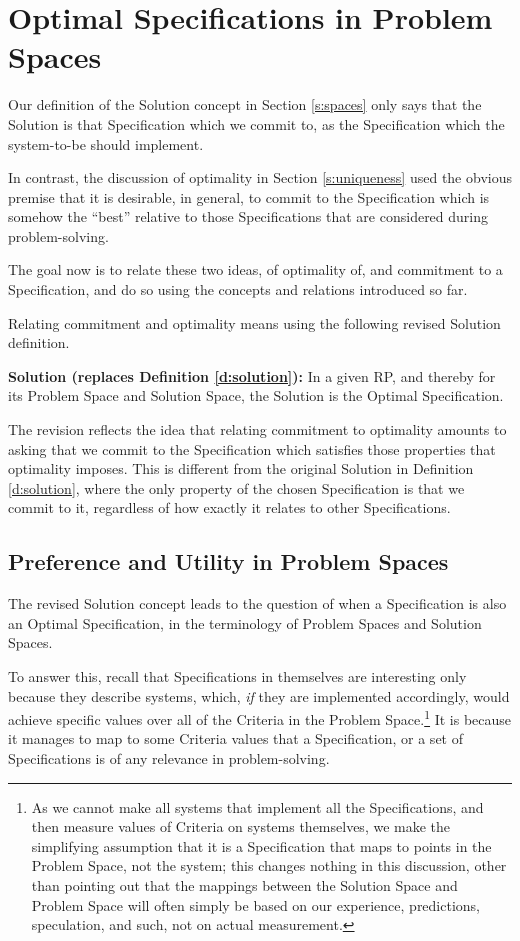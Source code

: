 \documentclass[graybox]{svmult}
\newcommand{\zi}[1]{\textit{#1}}
\newcommand{\xb}[1]{\textbf{#1}}
\newcommand{\RP}{RP}
\newcommand{\SolutionSpace}{Solution Space}
\newcommand{\ProblemSpace}{Problem Space}
\newcommand{\Specification}{Specification}
\newcommand{\Solution}{Solution}
\newcommand{\Criteria}{Criteria}
\newcommand{\OptimalSpecification}{Optimal Specification}
\begin{document}
%
\section{\OptimalSpecification s in \ProblemSpace s}\label{s:optimal-specifications}
Our definition of the \Solution{} concept in Section \ref{s:spaces} only says that the \Solution{} is that \Specification{} which we commit to, as the \Specification{} which the system-to-be should implement. 

In contrast, the discussion of optimality in Section \ref{s:uniqueness} used the obvious premise that it is desirable, in general, to commit to the \Specification{} which is somehow the ``best'' relative to those \Specification s that are considered during problem-solving. 

The goal now is to relate these two ideas, of optimality of, and commitment to a \Specification, and do so using the concepts and relations introduced so far. 

Relating commitment and optimality means using the following revised \Solution{} definition.

\begin{definition}\label{d:solution:revised}
\xb{\Solution{} (replaces Definition \ref{d:solution}):} In a given \RP, and thereby for its \ProblemSpace{} and \SolutionSpace, the \Solution{} is the \OptimalSpecification.
\end{definition}

The revision reflects the idea that relating commitment to optimality amounts to asking that we commit to the \Specification{} which satisfies those properties that optimality imposes. This is different from the original \Solution{} in Definition \ref{d:solution}, where the only property of the chosen \Specification{} is that we commit to it, regardless of how exactly it relates to other \Specification s. 


%
\subsection{Preference and Utility in \ProblemSpace s}\label{s:optimal-specifications:preference-utility}
The revised \Solution{} concept leads to the question of when a \Specification{} is also an \OptimalSpecification, in the terminology of \ProblemSpace s and \SolutionSpace s.

To answer this, recall that \Specification s in themselves are interesting only because they describe systems, which, \zi{if} they are implemented accordingly, would achieve specific values over all of the \Criteria{} in the \ProblemSpace.\footnote{As we cannot make all systems that implement all the \Specification s, and then measure values of \Criteria{} on systems themselves, we make the simplifying assumption that it is a \Specification{} that maps to points in the \ProblemSpace, not the system; this changes nothing in this discussion, other than pointing out that the mappings between the \SolutionSpace{} and \ProblemSpace{} will often simply be based on our experience, predictions, speculation, and such, not on actual measurement.} It is because it manages to map to some \Criteria{} values that a \Specification, or a set of \Specification s is of any relevance in problem-solving.
\end{document}
